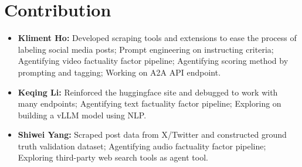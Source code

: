 \documentclass[12pt,letterpaper]{article}
\begin{document}
\section{Contribution}
\begin{itemize}
    \item \textbf{Kliment Ho:} Developed scraping tools and extensions to ease the process of labeling social media posts; Prompt engineering on instructing criteria; Agentifying video factuality factor pipeline; Agentifying scoring method by prompting and tagging; Working on A2A API endpoint.
    
    \item \textbf{Keqing Li:} Reinforced the huggingface site and debugged to work with many endpoints; Agentifying text factuality factor pipeline; Exploring on building a vLLM model using NLP.
    
    \item \textbf{Shiwei Yang:} Scraped post data from X/Twitter and constructed ground truth validation dataset; Agentifying audio factuality factor pipeline; Exploring third-party web search tools as agent tool.

\end{itemize}
\end{document}
